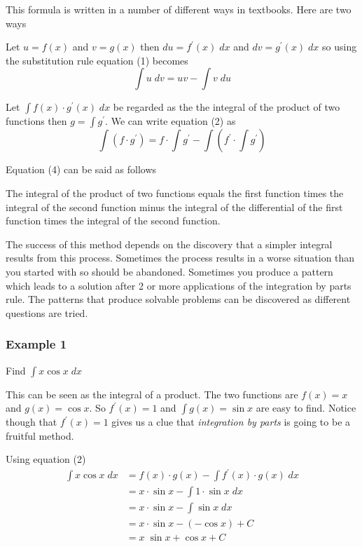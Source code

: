This formula is written in a number of different ways in textbooks. Here
are two ways 

Let $u =f (x)$ and $v =g (x)$ then $d u =f^{ \prime } (x)\; d x$ and $d v =g^{ \prime } (x)\; d x$ so using the substitution rule equation (1) becomes
\begin{equation}\int u\; d v =u v -\int v\; d u\tag{3}
\end{equation}

Let $\int f (x) \cdot g^{ \prime } (x)\; d x$ be regarded as the the integral of the product of two functions then $g =\int g^{ \prime }$. We can write equation (2) as
\begin{equation}\int \left (f \cdot g^{ \prime }\right ) =f \cdot \int  g^{ \prime } -\int \left (f^{ \prime } \cdot \int  g^{ \prime }\right )\tag{4}
\end{equation}

Equation (4) can be said as follows 

The integral of the product of two functions
equals the first function times the integral of the second function minus the integral of the differential of the first function times the integral of the
second function. 

The success of this method depends on the discovery that a simpler integral results from this process. Sometimes
the process results in a worse situation than you started with so should be abandoned. Sometimes you produce
a pattern which leads to a solution after 2 or more applications of the integration by parts rule. The patterns
that produce solvable problems can be discovered as different questions are tried. 

\subsubsection{Example 1}
Find $\int x \cos  x\; d x$ 

This can be seen as the integral of a product. The two functions
are $f (x) =x$ and $g (x) =\cos  x$. So $f^{ \prime } (x) =1$ and $\int g (x) =\sin  x$ are easy to find. Notice though that $f^{ \prime } (x) =1$ gives us a clue that \emph{integration by parts} is going to be a fruitful method. 

Using
equation (2)
\begin{align*}\int x \cos  x\; d x &  = f (x) \cdot g (x) -\int f^{ \prime } (x) \cdot g (x)\; d x \\
 &  = x \cdot \sin  x -\int 1 \cdot \sin  x\; d x \\
 &  = x \cdot \sin  x -\int \sin  x\; d x \\
 &  = x \cdot \sin  x -\left ( -\cos  x\right ) +C \\
 &  = x\; \sin  x +\cos  x +C\end{align*}


